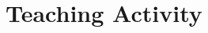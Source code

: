 \documentclass[a4paper,10pt]{article}
\begin{document}
\section*{Teaching Activity}


\end{document}
